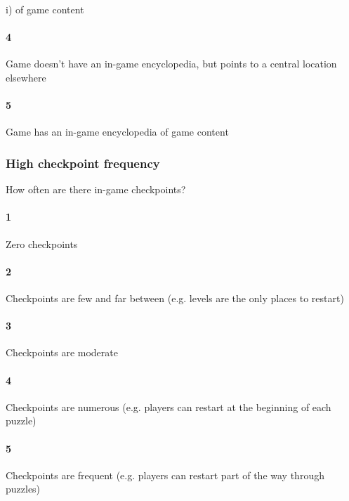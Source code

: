 i) of game content\paragraph{4}Game doesn't have an in-game encyclopedia, but points to a central location elsewhere\paragraph{5}Game has an in-game encyclopedia of game content\subsubsection{High checkpoint frequency}How often are there in-game checkpoints?\paragraph{1}Zero checkpoints\paragraph{2}Checkpoints are few and far between (e.g. levels are the only places to restart)\paragraph{3}Checkpoints are moderate\paragraph{4}Checkpoints are numerous (e.g. players can restart at the beginning of each puzzle)\paragraph{5}Checkpoints are frequent (e.g. players can restart part of the way through puzzles)\